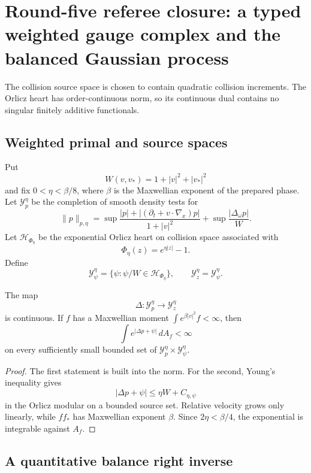 \section{Round-five referee closure: a typed weighted gauge complex and the balanced Gaussian process}
\label{sec:r5-b3}

The collision source space is chosen to contain quadratic collision increments.
The Orlicz heart has order-continuous norm, so its continuous dual contains no
singular finitely additive functionals.

\subsection{Weighted primal and source spaces}

Put
\[
 W(v,v_*)=1+|v|^2+|v_*|^2
\]
and fix \(0<\eta<\beta/8\), where \(\beta\) is the Maxwellian exponent of the
prepared phase.  Let \({\mathcal Y}_p^\eta\) be the completion of smooth
density tests for
\[
 \|p\|_{p,\eta}
 =
 \sup\frac{|p|+|(\partial_t+v\cdot\nabla_x)p|}{1+|v|^2}
 +\sup\frac{|\Delta_\omega p|}{W}.
\]
Let \({\mathcal H}_{\Phi_\eta}\) be the exponential Orlicz heart on collision
space associated with
\[
 \Phi_\eta(z)=e^{\eta|z|}-1.
\]
Define
\[
 {\mathcal Y}_\psi^\eta
 =\{\psi:\psi/W\in{\mathcal H}_{\Phi_\eta}\},
 \qquad
 {\mathcal Y}_z^\eta={\mathcal Y}_\psi^\eta.
\]

\begin{lemma}
\label{lem:r5-b3-typed}
The map
\[
 \Delta:{\mathcal Y}_p^\eta\longrightarrow{\mathcal Y}_z^\eta
\]
is continuous.  If \(f\) has a Maxwellian moment
\(\int e^{\beta|v|^2}f<\infty\), then
\[
 \int e^{|\Delta p+\psi|}\,dA_f<\infty
\]
on every sufficiently small bounded set of
\({\mathcal Y}_p^\eta\times{\mathcal Y}_\psi^\eta\).
\end{lemma}

\begin{proof}
The first statement is built into the norm.  For the second, Young's
inequality gives
\[
 |\Delta p+\psi|
 \le \eta W+C_{\eta,\psi}
\]
in the Orlicz modular on a bounded source set.  Relative velocity grows only
linearly, while \(ff_*\) has Maxwellian exponent \(\beta\).  Since
\(2\eta<\beta/4\), the exponential is integrable against \(A_f\).
\end{proof}

\subsection{A quantitative balance right inverse}

